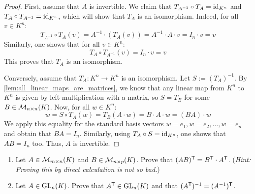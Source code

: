 \begin{proof}
First, assume that $A$ is invertible. We claim that $T_{A^{-1}} \circ T_A = \operatorname{id}_{K^n}$ and $T_A \circ T_{A^{-1}} = \operatorname{id}_{K^n}$, which will show that $T_A$ is an isomorphism. Indeed, for all $v \in K^n$:
\begin{equation*}
    T_{A^{-1}} \circ T_A(v) = A^{-1} \cdot (T_A(v)) = A^{-1} \cdot A \cdot v = I_n \cdot v = v
\end{equation*}
Similarly, one shows that for all $v \in K^n$:
\begin{equation*}
    T_A \circ T_{A^{-1}}(v) = I_n \cdot v = v
\end{equation*}
This proves that $T_A$ is an isomorphism.
 
Conversely, assume that $T_A: K^n \to K^n$ is an isomorphism. Let $S := (T_A)^{-1}$. By \cref{lem:all_linear_maps_are_matrices}, we know that any linear map from $K^n$ to $K^n$ is given by left-multiplication with a matrix, so $S = T_B$ for some $B \in \mathcal{M}_{n \times n}(K)$. Now, for all $w \in K^n$:
\begin{equation*}
    w = S \circ T_A(w) = T_B(A \cdot w) = B \cdot A \cdot w = (BA) \cdot w
\end{equation*}
We apply this equality for the standard basis vectors $w = e_1, w = e_2, \dots, w = e_n$ and obtain that $BA = I_n$. Similarly, using $T_A \circ S = \operatorname{id}_{K^n}$, one shows that $AB = I_n$ too. Thus, $A$ is invertible.
\end{proof}

\begin{exercise}
\label{exc:transpose_properties_multiplication}
\begin{enumerate}[label=\textbf{(\alph*)}]
    \item Let $A \in \mathcal{M}_{m \times n}(K)$ and $B \in \mathcal{M}_{n \times p}(K)$. Prove that $(AB)^{\mathsf{T}} = B^{\mathsf{T}} \cdot A^{\mathsf{T}}$. \newline (\textit{Hint: Proving this by direct calculation is not so bad.})
    \item Let $A \in \operatorname{GL}_n(K)$. Prove that $A^{\mathsf{T}} \in \operatorname{GL}_n(K)$ and that $(A^{\mathsf{T}})^{-1} = (A^{-1})^{\mathsf{T}}$.
\end{enumerate}
\end{exercise}

